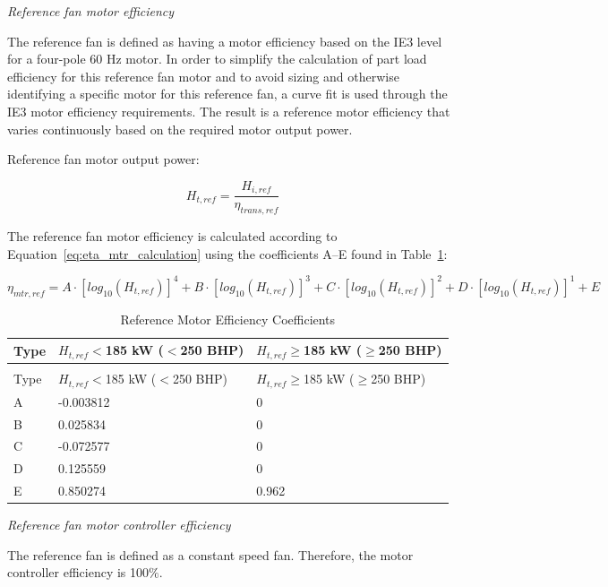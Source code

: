 \emph{Reference fan motor efficiency}

The reference fan is defined as having a motor efficiency based on the IE3 level for a four-pole 60 Hz motor. In order to simplify the calculation of part load efficiency for this reference fan motor and to avoid sizing and otherwise identifying a specific motor for this reference fan, a curve fit is used through the IE3 motor efficiency requirements. The result is a reference motor efficiency that varies continuously based on the required motor output power.

Reference fan motor output power:

\begin{equation}
H_{t,ref}=\frac{H_{i,ref}}{\eta_{trans,ref}}
\label{eq:eta_ref_calculation}
\end{equation}

The reference fan motor efficiency is calculated according to Equation~\ref{eq:eta_mtr_calculation} using the coefficients A–E found in Table~\ref{table:reference-motor-efficiency-coefficients}:

\begin{equation}
\eta_{mtr,ref} = A\cdot[log_{10} (H_{t,ref})]^4 + B\cdot[log_{10} (H_{t,ref})]^3 +C\cdot[log_{10} (H_{t,ref})]^2 +D\cdot[log_{10} (H_{t,ref})]^1 + E
\label{eq:eta_mtr_calculation}
\end{equation}

\begin{longtable}[c]{p{1.0in}p{1.5in}p{1.5in}}
\caption{Reference Motor Efficiency Coefficients \label{table:reference-motor-efficiency-coefficients}} \tabularnewline
\toprule 
Type & \(H_{t,ref}\)$<$185 kW ($<$250 BHP) & \(H_{t,ref}\)$\geq$185 kW ($\geq$250 BHP) \tabularnewline \midrule
\midrule
\endfirsthead

\caption[]{Reference Motor Efficiency Coefficients} \tabularnewline
\toprule 
Type & \(H_{t,ref}\)$<$185 kW ($<$250 BHP) & \(H_{t,ref}\)$\geq$185 kW ($\geq$250 BHP) \tabularnewline \midrule
\midrule
\endhead

A & -0.003812 & 0 \tabularnewline
B & 0.025834 & 0 \tabularnewline
C & -0.072577 & 0 \tabularnewline
D & 0.125559 & 0 \tabularnewline
E & 0.850274 & 0.962 \tabularnewline
\bottomrule
\end{longtable}

\emph{Reference fan motor controller efficiency}


The reference fan is defined as a constant speed fan. Therefore, the motor controller efficiency is 100$\%$.

